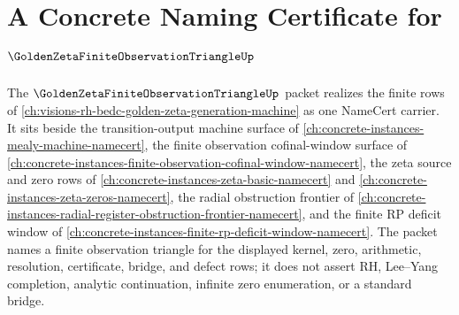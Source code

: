 \chapter{A Concrete Naming Certificate for $\GoldenZetaFiniteObservationTriangleUp$}
\label{ch:concrete-instances-golden-zeta-finite-observation-triangle-namecert}

The $\GoldenZetaFiniteObservationTriangleUp$ packet realizes the finite rows of \autoref{ch:visions-rh-bedc-golden-zeta-generation-machine} as one NameCert carrier. It sits beside the transition-output machine surface of \autoref{ch:concrete-instances-mealy-machine-namecert}, the finite observation cofinal-window surface of \autoref{ch:concrete-instances-finite-observation-cofinal-window-namecert}, the zeta source and zero rows of \autoref{ch:concrete-instances-zeta-basic-namecert} and \autoref{ch:concrete-instances-zeta-zeros-namecert}, the radial obstruction frontier of \autoref{ch:concrete-instances-radial-register-obstruction-frontier-namecert}, and the finite RP deficit window of \autoref{ch:concrete-instances-finite-rp-deficit-window-namecert}. The packet names a finite observation triangle for the displayed kernel, zero, arithmetic, resolution, certificate, bridge, and defect rows; it does not assert RH, Lee--Yang completion, analytic continuation, infinite zero enumeration, or a standard bridge.


